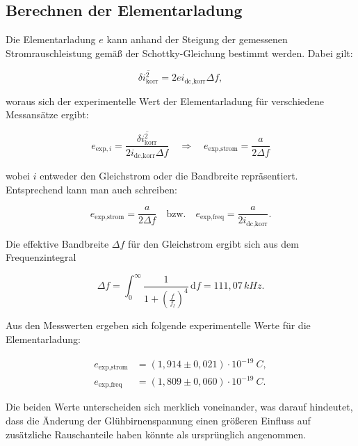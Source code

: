\subsection{Berechnen der Elementarladung}

Die Elementarladung \(e\) kann anhand der Steigung der gemessenen Stromrauschleistung gemäß der Schottky-Gleichung bestimmt werden. 
Dabei gilt:

\begin{equation}
    \overline{\delta i_{\text{korr}}^2} = 2 e i_{\text{dc,korr}} \Delta f,
\end{equation}

woraus sich der experimentelle Wert der Elementarladung für verschiedene Messansätze ergibt:

\begin{equation*}
    e_{\text{exp},i} = \frac{\overline{\delta i_{\text{korr}}^2}}{2 i_{\text{dc,korr}} \Delta f} \quad \Rightarrow \quad 
    e_{\text{exp,strom}} = \frac{a}{2 \Delta f}
\end{equation*}

wobei \(i\) entweder den Gleichstrom oder die Bandbreite repräsentiert. Entsprechend kann man auch schreiben:

\begin{equation*}
    e_{\text{exp,strom}} = \frac{a}{2 \Delta f} \quad \text{bzw.} \quad e_{\text{exp,freq}} = \frac{a}{2 i_{\text{dc,korr}}}.
\end{equation*}

Die effektive Bandbreite \(\Delta f\) für den Gleichstrom ergibt sich aus dem Frequenzintegral

\begin{equation}
    \Delta f = \int_0^{\infty} \frac{1}{1+\left(\frac{f}{f_l}\right)^4} \, \mathrm{d}f = 111{,}07\,\si{kHz}.
\end{equation}

Aus den Messwerten ergeben sich folgende experimentelle Werte für die Elementarladung:

\begin{align}
    e_{\text{exp,strom}} &= (1{,}914 \pm 0{,}021) \cdot 10^{-19}~\si{C}, \\
    e_{\text{exp,freq}} &= (1{,}809 \pm 0{,}060) \cdot 10^{-19}~\si{C}.
\end{align}

Die beiden Werte unterscheiden sich merklich voneinander, was darauf hindeutet, dass die Änderung der Glühbirnenspannung einen größeren Einfluss auf zusätzliche Rauschanteile haben könnte als ursprünglich angenommen.

